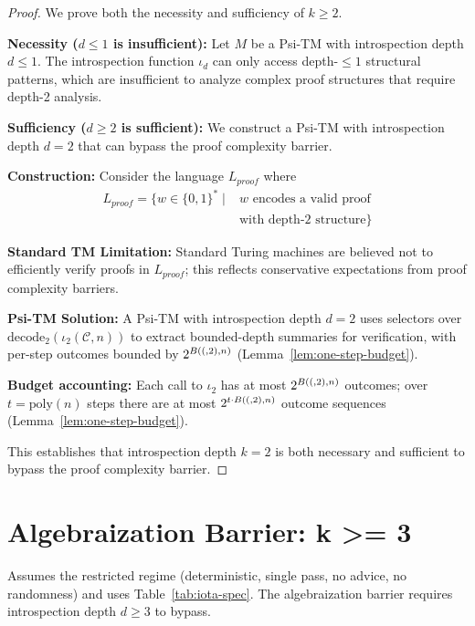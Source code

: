 \begin{proof}
We prove both the necessity and sufficiency of $k \geq 2$.

\textbf{Necessity ($d \le 1$ is insufficient):}
Let $M$ be a Psi-TM with introspection depth $d \leq 1$. The introspection function $\iota_d$ can only access depth-$\leq 1$ structural patterns, which are insufficient to analyze complex proof structures that require depth-2 analysis.

\textbf{Sufficiency ($d \ge 2$ is sufficient):}
We construct a Psi-TM with introspection depth $d = 2$ that can bypass the proof complexity barrier.

\textbf{Construction:}
Consider the language $L_{proof}$ where
\begin{align}
L_{proof} = \{w \in \{0,1\}^* \mid &\text{$w$ encodes a valid proof} \nonumber \\
&\text{with depth-2 structure}\}
\end{align}

\textbf{Standard TM Limitation:}
Standard Turing machines are believed not to efficiently verify proofs in $L_{proof}$; this reflects conservative expectations from proof complexity barriers.

\textbf{Psi-TM Solution:}
A Psi-TM with introspection depth $d = 2$ uses selectors over $\mathrm{decode}_2(\iota_2(\mathcal{C},n))$ to extract bounded-depth summaries for verification, with per-step outcomes bounded by $2^{B((,2),n)}$ (Lemma~\ref{lem:one-step-budget}).

\textbf{Budget accounting:}
Each call to $\iota_2$ has at most $2^{B((,2),n)}$ outcomes; over $t=\mathrm{poly}(n)$ steps there are at most $2^{t\cdot B((,2),n)}$ outcome sequences (Lemma~\ref{lem:one-step-budget}).

This establishes that introspection depth $k = 2$ is both necessary and sufficient to bypass the proof complexity barrier.
\end{proof}

\section{Algebraization Barrier: k >= 3}

\begin{theorem}
Assumes the restricted regime (deterministic, single pass, no advice, no randomness) and uses Table~\ref{tab:iota-spec}.
The algebraization barrier requires introspection depth $d \geq 3$ to bypass.
\end{theorem}

